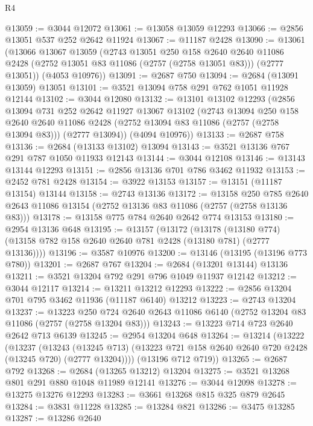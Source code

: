 \begin{lexlean}{R4}
\begin{coremodule}
@13059 := @3044 @12072
@13061 := @13058 @13059 @12293
@13066 := @2856 @13051 @537 @252 @2642 @11924
@13067 := @11187 @2428
@13090 := @13061
    (@13066
      @13067
      @13059
      (@2743
        @13051
        @250
        @158
        @2640
        @2640
        @11086
        @2428
        (@2752 @13051 @83 @11086 (@2757 (@2758 @13051 @83)))
        (@2777 @13051))
      (@4053 @10976))
@13091 := @2687 @750
@13094 := @2684 (@13091 @13059) @13051
@13101 := @3521 @13094 @758 @291 @762 @1051 @11928 @12144
@13102 := @3044 @12080
@13132 := @13101
    @13102
    @12293
    (@2856
      @13094
      @731
      @252
      @2642
      @11927
      @13067
      @13102
      (@2743
        @13094
        @250
        @158
        @2640
        @2640
        @11086
        @2428
        (@2752 @13094 @83 @11086 (@2757 (@2758 @13094 @83)))
        (@2777 @13094))
      (@4094 @10976))
@13133 := @2687 @758
@13136 := @2684 (@13133 @13102) @13094
@13143 := @3521 @13136 @767 @291 @787 @1050 @11933 @12143
@13144 := @3044 @12108
@13146 := @13143 @13144 @12293
@13151 := @2856 @13136 @701 @786 @3462 @11932
@13153 := @2452 @781 @2428
@13154 := @3922 @13153
@13157 := @13151 (@11187 @13154) @13144
@13158 := @2743 @13136
@13172 := @13158
    @250
    @785
    @2640
    @2643
    @11086
    @13154
    (@2752 @13136 @83 @11086 (@2757 (@2758 @13136 @83)))
@13178 := @13158 @775 @784 @2640 @2642 @774 @13153
@13180 := @2954 @13136 @648
@13195 := @13157
    (@13172
      (@13178 (@13180 @774) (@13158 @782 @158 @2640 @2640 @781 @2428 (@13180 @781) (@2777 @13136))))
@13196 := @3587 @10976
@13200 := @13146 (@13195 (@13196 @773 @780))
@13201 := @2687 @767
@13204 := @2684 (@13201 @13144) @13136
@13211 := @3521 @13204 @792 @291 @796 @1049 @11937 @12142
@13212 := @3044 @12117
@13214 := @13211 @13212 @12293
@13222 := @2856 @13204 @701 @795 @3462 @11936 (@11187 @6140) @13212
@13223 := @2743 @13204
@13237 := @13223
    @250
    @724
    @2640
    @2643
    @11086
    @6140
    (@2752 @13204 @83 @11086 (@2757 (@2758 @13204 @83)))
@13243 := @13223 @714 @723 @2640 @2642 @713 @6139
@13245 := @2954 @13204 @648
@13264 := @13214
    (@13222
      (@13237
        (@13243
          (@13245 @713)
          (@13223 @721 @158 @2640 @2640 @720 @2428 (@13245 @720) (@2777 @13204))))
      (@13196 @712 @719))
@13265 := @2687 @792
@13268 := @2684 (@13265 @13212) @13204
@13275 := @3521 @13268 @801 @291 @880 @1048 @11989 @12141
@13276 := @3044 @12098
@13278 := @13275 @13276 @12293
@13283 := @3661 @13268 @815 @325 @879 @2645
@13284 := @3831 @11228
@13285 := @13284 @821
@13286 := @3475 @13285
@13287 := @13286 @2640

\end{coremodule}
\end{lexlean}
